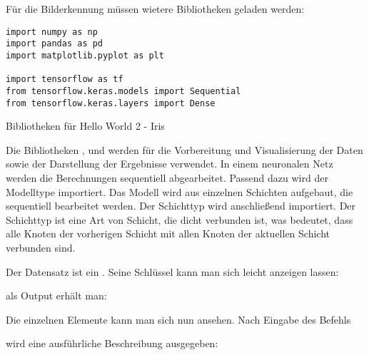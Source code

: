 Für die Bilderkennung müssen wietere Bibliotheken geladen werden:

\begin{code}
    \begin{lstlisting}[numbers=none]
import numpy as np
import pandas as pd
import matplotlib.pyplot as plt

import tensorflow as tf
from tensorflow.keras.models import Sequential
from tensorflow.keras.layers import Dense
\end{lstlisting}
\caption{Bibliotheken für Hello World 2 - Iris}
\end{code}


Die Bibliotheken ,  und  werden für die Vorbereitung und Visualisierung der Daten sowie der Darstellung der Ergebnisse verwendet. In einem neuronalen Netz werden die Berechnungen sequentiell abgearbeitet. Passend dazu wird der Modelltype  importiert. Das Modell wird aus einzelnen Schichten aufgebaut, die sequentiell bearbeitet werden. Der Schichttyp  wird anschließend importiert. Der Schichttyp  ist eine Art von Schicht, die \glqq dicht\grqq{} verbunden ist, was bedeutet, dass alle Knoten der vorherigen Schicht mit allen Knoten der aktuellen Schicht verbunden sind.


Der Datensatz ist ein . Seine Schlüssel kann man sich leicht anzeigen lassen:

\medskip


\medskip

als Output erhält man:

\medskip


\medskip

Die einzelnen Elemente kann man sich nun ansehen. Nach Eingabe des Befehls 

\medskip


\medskip
wird eine ausführliche Beschreibung ausgegeben:

